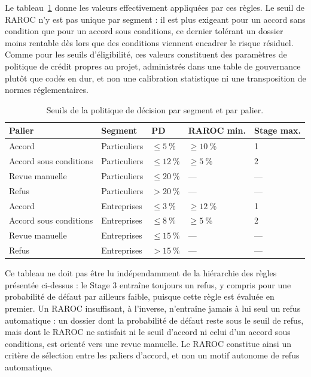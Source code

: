 Le tableau~\ref{tab:decision-policy} donne les valeurs effectivement appliquées par ces règles. Le seuil de RAROC n'y est pas unique par segment : il est plus exigeant pour un accord sans condition que pour un accord sous conditions, ce dernier tolérant un dossier moins rentable dès lors que des conditions viennent encadrer le risque résiduel. Comme pour les seuils d'éligibilité, ces valeurs constituent des paramètres de politique de crédit propres au projet, administrés dans une table de gouvernance plutôt que codés en dur, et non une calibration statistique ni une transposition de normes réglementaires.

\begin{table}[htbp]
    \centering
    \footnotesize
    \caption{Seuils de la politique de décision par segment et par palier.}
    \label{tab:decision-policy}
    \begin{tabular}{p{2.6cm}p{2.6cm}p{2.3cm}p{2.3cm}p{2.3cm}}
        \toprule
        \textbf{Palier} & \textbf{Segment} & \textbf{PD} & \textbf{RAROC min.} & \textbf{Stage max.} \\
        \midrule
        Accord & Particuliers & $\leq 5~\%$ & $\geq 10~\%$ & 1 \\
        Accord sous conditions & Particuliers & $\leq 12~\%$ & $\geq 5~\%$ & 2 \\
        Revue manuelle & Particuliers & $\leq 20~\%$ & — & — \\
        Refus & Particuliers & $> 20~\%$ & — & — \\
        \addlinespace
        Accord & Entreprises & $\leq 3~\%$ & $\geq 12~\%$ & 1 \\
        Accord sous conditions & Entreprises & $\leq 8~\%$ & $\geq 5~\%$ & 2 \\
        Revue manuelle & Entreprises & $\leq 15~\%$ & — & — \\
        Refus & Entreprises & $> 15~\%$ & — & — \\
        \bottomrule
    \end{tabular}
\end{table}

Ce tableau ne doit pas être lu indépendamment de la hiérarchie des règles présentée ci-dessus : le Stage 3 entraîne toujours un refus, y compris pour une probabilité de défaut par ailleurs faible, puisque cette règle est évaluée en premier. Un RAROC insuffisant, à l'inverse, n'entraîne jamais à lui seul un refus automatique : un dossier dont la probabilité de défaut reste sous le seuil de refus, mais dont le RAROC ne satisfait ni le seuil d'accord ni celui d'un accord sous conditions, est orienté vers une revue manuelle. Le RAROC constitue ainsi un critère de sélection entre les paliers d'accord, et non un motif autonome de refus automatique.

